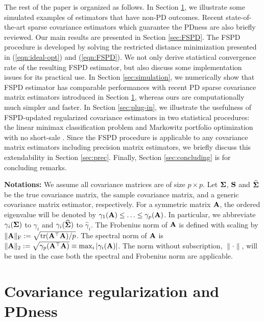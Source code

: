 \documentclass[times,sort&compress,3p]{elsarticle}
\newcommand{\tr}{\mathrm{tr}}
\begin{document}
The rest of the paper is organized as follows.
In Section \ref{sec:previous},
we illustrate some simulated examples of estimators that have non-PD outcomes.
Recent state-of-the-art sparse covariance estimators which guarantee the PDness are also
briefly reviewed. Our main results are presented in Section \ref{sec:FSPD}.
The FSPD procedure is developed
by solving the restricted distance minimization presented in (\ref{eqn:ideal-opt}) and (\ref{eqn:FSPD}).
We not only derive statistical convergence rate
of the resulting FSPD estimator, but also discuss some implementation issues for its practical use.
In Section \ref{sec:simulation}, we numerically show that FSPD estimator has
 comparable performances with recent PD sparse covariance matrix estimators introduced in Section \ref{sec:previous}, whereas ours
 are computationally much simpler and faster. In Section \ref{sec:plug-in}, we illustrate the usefulness of FSPD-updated regularized covariance estimators in two statistical procedures: the linear minimax classification problem
  \citep{Lanckriet2002} and Markowitz portfolio optimization with no short-sale \citep{Jagannathan2003}.
Since the FSPD procedure is applicable to any covariance matrix estimators including precision matrix
estimators, we briefly discuss this extendability in Section \ref{sec:prec}.
Finally, Section \ref{sec:concluding} is for concluding remarks.

 

{\bf Notations:} We assume all covariance matrices are of size $p \times p$.  Let ${\bf \Sigma}$,
$\bf S$ and $\widehat{\bf \Sigma}$ be the true covariance matrix, the sample covariance matrix, and a generic covariance 
matrix estimator, respectively. For a symmetric matrix ${\bf A}$, the ordered  eigenvalue will be denoted by $\gamma_1({\bf A}) \leq \ldots \leq \gamma_p({\bf A})$. In particular, we abbreviate $\gamma_i({\bf \Sigma})$ to $\gamma_i$ and $\gamma_i(\widehat{\bf \Sigma})$ to $\widehat{\gamma}_i$. The Frobenius norm of ${\bf A}$ is
 defined with scaling by $\|{\bf A}\|_{\rm F} := \sqrt{\tr({\bf A}^{\top}{\bf A})/p}$. The spectral norm
 of ${\bf A}$ is $\|{\bf A}\|_2 := \sqrt{\gamma_{p}({\bf A}^{\top}{\bf A})} \equiv \max_i |\gamma_{i}({\bf A})|$. The
 norm without subscription, $\|\cdot\|$, will be used in the case both the spectral and Frobenius norm are applicable.

 
\section{Covariance regularization and PDness}\label{sec:previous}
\end{document}
